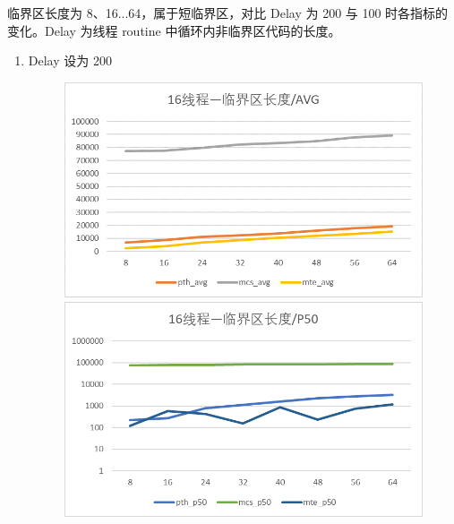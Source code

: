 \documentclass[UTF8]{ctexart}
\begin{document}
临界区长度为 8、16...64，属于短临界区，对比 Delay 为 200 与 100 时各指标的变化。Delay 为线程 routine 中循环内非临界区代码的长度。

\begin{enumerate}
    \item Delay 设为 200

    \begin{figure}[!h]
        \centering
        \begin{minipage}{0.49\linewidth}
            \centering
            \includegraphics[scale=0.64]{../images/1.png}
        \end{minipage}
        \begin{minipage}{0.49\linewidth}
            \centering
            \includegraphics[scale=0.64]{../images/2.png}
        \end{minipage}
    \end{figure}


\end{enumerate}
\end{document}
